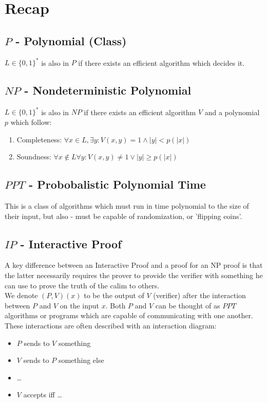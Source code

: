 \section{Recap}
\subsection{$P$ - Polynomial (Class)}
$L\in\{0,1\}^*$ is also in $P$ if there exists an efficient algorithm which decides it.

\subsection{$NP$ - Nondeterministic Polynomial}
$L\in\{0,1\}^*$ is also in $NP$ if there exists an efficient algorithm $V$ and a polynomial $p$ which follow:

\begin{enumerate}
    \item Completeness: $\forall x\in L, \exists y: V(x,y) = 1 \wedge |y|<p(|x|)$
    \item Soundness: $\forall x\notin L \forall y: V(x,y) \neq 1 \vee |y| \geq p(|x|)$
\end{enumerate}

\subsection{$PPT$ - Probobalistic Polynomial Time}
This is a class of algorithms which must run in time polynomial to the size of their input, but also - must be capable of randomization, or 'flipping coins'.

\subsection{$IP$ - Interactive Proof}
A key difference between an Interactive Proof and a proof for an NP proof is that the latter necessarily requires the prover to provide the verifier with something he can use to prove the truth of the calim to others.\\

We denote $(P,V)(x)$ to be the output of $V$ (verifier) after the interaction between $P$ and $V$ on the input $x$. Both $P$ and $V$ can be thought of as $PPT$ algorithms or programs which are capable of communicating with one another.\\

These interactions are often described with an interaction diagram:
\begin{itemize}
    \item $P$ sends to $V$ something
    \item $V$ sends to $P$ something else
    \item \dots
    \item $V$ accepts iff \dots
\end{itemize}

